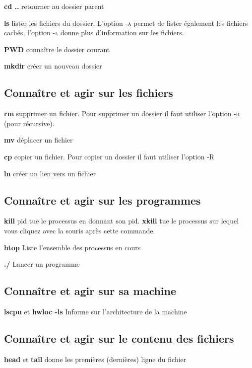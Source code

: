 \documentclass[11, a4paper, landscape]{article}
\begin{document}
\begin{multicols*}{3}
{  \textbf{cd ..} \quad retourner au dossier parent 

  \textbf{ls} \quad lister les fichiers du dossier. L'option \textsc{-a} permet de lister également les fichiers cachés, l'option \textsc{-l} donne plus d'information sur les fichiers.

  \textbf{PWD} \quad connaître le dossier courant

  \textbf{mkdir} \quad créer un nouveau dossier
  
  \subsection{Connaître et agir sur les fichiers}
  
  \textbf{rm} \quad supprimer un fichier. Pour supprimer un dossier il faut utiliser l'option \textsc{-r} (pour récursive). 
  
  \textbf{mv} \quad déplacer un fichier  
  
  \textbf{cp} \quad copier un fichier. Pour copier un dossier il faut utiliser l'option \textsc{-R}
  
  \textbf{ln} \quad créer un lien vers un fichier  
  
  \subsection{Connaître et agir sur les programmes}
  
  \textbf{kill} pid \quad tue le processus en donnant son pid. \textbf{xkill} tue le processus sur lequel vous cliquez avec la souris après cette commande.
  
  \textbf{htop} \quad Liste l'ensemble des processus en cours

  \textbf{./} \quad Lancer un programme
  
  \subsection{Connaître et agir sur sa machine}

  \textbf{lscpu} et \textbf{hwloc -ls} \quad Informe sur l'architecture de la machine 
  
  \subsection{Connaître et agir sur le contenu des fichiers}
  
  \textbf{head} et \textbf{tail} \quad donne les premières (dernières) ligne du fichier
  
}
\end{multicols*}
\end{document}
